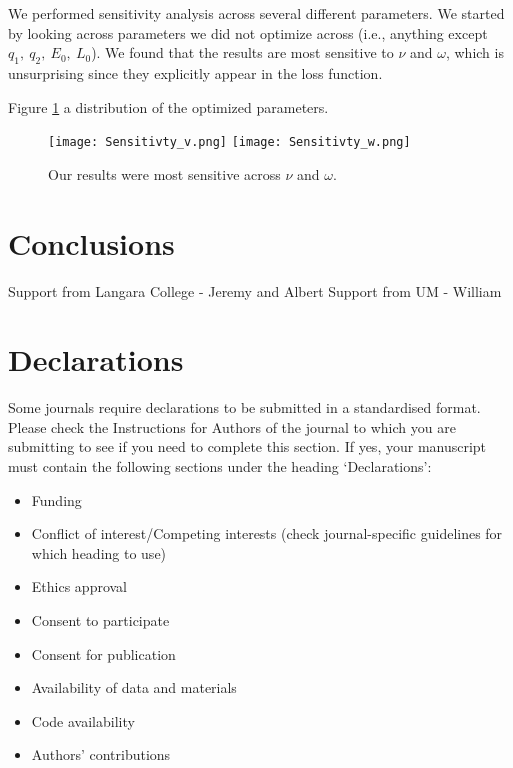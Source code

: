 \documentclass[sn-mathphys,Numbered]{sn-jnl}%
\theoremstyle{thmstyleone}%
\theoremstyle{thmstyletwo}%
\theoremstyle{thmstylethree}%
\begin{document}
We performed sensitivity analysis across several different parameters.  We started by looking across parameters we did not optimize across (i.e., anything except $q_1,~q_2,~E_0,~L_0$).  We found that the results are most sensitive to $\nu$ and $\omega$, which is unsurprising since they explicitly appear in the loss function.




Figure \ref{fig:OptimizedParameterDistribution} a distribution of the optimized parameters.

\begin{figure}
    \texttt{[image: Sensitivty\_v.png]}
    \texttt{[image: Sensitivty\_w.png]}  
    
    \caption{Our results were most sensitive across $\nu$ and $\omega$.}
    \label{fig:OptimizedParameterDistribution}
\end{figure}







\section{Conclusions}\label{sec7}


\backmatter



Support from Langara College - Jeremy and Albert
Support from UM - William



\section*{Declarations}

Some journals require declarations to be submitted in a standardised format. Please check the Instructions for Authors of the journal to which you are submitting to see if you need to complete this section. If yes, your manuscript must contain the following sections under the heading `Declarations':

\begin{itemize}
\item Funding
\item Conflict of interest/Competing interests (check journal-specific guidelines for which heading to use)
\item Ethics approval 
\item Consent to participate
\item Consent for publication
\item Availability of data and materials
\item Code availability 
\item Authors' contributions
\end{itemize}
\end{document}
